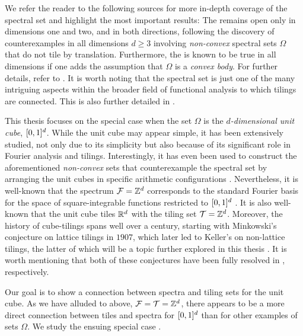 \documentclass[../thesis.tex]{subfiles}
\begin{document}
We refer the reader to the following sources for more in-depth coverage of the spectral set  and highlight the most important results: The  remains open only in dimensions one and two, and in both directions, following the discovery of counterexamples in all dimensions $d \geq 3$ involving \emph{non-convex} spectral sets $\Omega$ that do not tile by translation. Furthermore, the  is known to be true in all dimensions if one adds the assumption that $\Omega$ is a \emph{convex body}. For further details, refer to \cite{levFugledeConjectureConvex2022,dutkayReductionsSpectralSet2014,liDualityPropertiesSpectra2010,farkasFugledeConjectureExistence2006,kolountzakisStudyTranslationalTiling2003,jorgensenSpectralPairsCartesian2001}. It is worth noting that the spectral set  is just one of the many intriguing aspects within the broader field of functional analysis to which tilings are connected. This is also further detailed in \cite{kolountzakisStudyTranslationalTiling2003}. 

This thesis focuses on the special case when the set $\Omega$ is the \emph{$d$-dimensional unit cube}, $[0,1]^d$. While the unit cube may appear simple, it has been extensively studied, not only due to its simplicity but also because of its significant role in Fourier analysis and tilings. Interestingly, it has even been used to construct the aforementioned \emph{non-convex} sets that counterexample the spectral set  by arranging the unit cubes in specific arithmetic configurations \cite{levFugledeConjectureConvex2022}. Nevertheless, it is well-known that the spectrum $\mathcal{F}=\mathbb{Z}^d$ corresponds to the standard Fourier basis for the space of square-integrable functions restricted to $[0,1]^d$ \cite{lagariasOrthonormalBasesExponentials2000}. It is also well-known that the unit cube tiles $\mathbb{R}^d$ with the tiling set $\mathcal{T}=\mathbb{Z}^d$. Moreover, the history of cube-tilings spans well over a century, starting with Minkowski's conjecture on lattice tilings in $1907$, which later led to Keller's  on non-lattice tilings, the latter of which will be a topic further explored in this thesis \cite{liDualityPropertiesSpectra2010,iosevichSpectralTilingProperties1998}. It is worth mentioning that both of these conjectures have been fully resolved in \cite{hajosUeberEinfacheUnd1942,brakensiekResolutionKellerConjecture2020}, respectively.

Our goal is to show a connection between spectra and tiling sets for the unit cube. As we have alluded to above, $\mathcal{F}=\mathcal{T}=\mathbb{Z}^d$, there appears to be a more direct connection between tiles and spectra for $[0,1]^d$ than for other examples of sets $\Omega$. We study the ensuing special case \cite{iosevichSpectralTilingProperties1998}.
\end{document}
